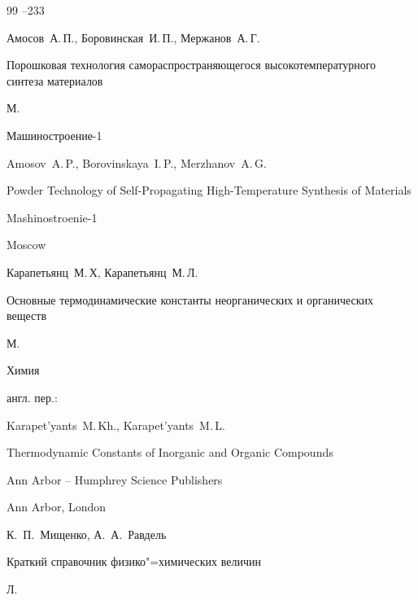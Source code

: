 \begin{thebibliography}{99}
--233




\by Амосов~А.\,П., Боровинская~И.\,П., Мержанов~А.\,Г.

\book Порошковая технология самораспространяющегося высокотемпературного синтеза материалов

\publaddr М.

\publ \mbox{Машиностроение-1}



\misctransl

\by Amosov~A.\,P., Borovinskaya~I.\,P., Merzhanov~A.\,G.

\book Powder Technology of Self-Propagating High-Temperature Synthesis of Materials

\publ Mashinostroenie-1

\publaddr Moscow






\by Карапетьянц~М.\,Х, Карапетьянц~М.\,Л.

\book Основные термодинамические константы неорганических и органических веществ

\publaddr М.

\publ Химия



\transl англ. пер.:{} {}

\by Ka\-ra\-pe\-t’yants~M.\,Kh.,  Karapet’yants~M.\,L. 

\book Thermodynamic Constants of Inorganic and Organic Compounds

\publ Ann Arbor – Humphrey Science Publishers

\publaddr Ann Arbor, London










\eds К.~П.~Мищенко, А.~А.~Равдель

\book Краткий справочник физико"=химических величин

\publaddr Л.


\end{thebibliography}
